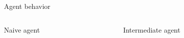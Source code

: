 \documentclass[bigger]{beamer}
\begin{document}
\begin{frame}[label={sec:orga689496}]{Agent behavior}
\begin{columns}
\begin{column}[t]{0.33\columnwidth}
\begin{center}
\small
Naive agent\\[1em]
\end{center}
\end{column}
\begin{column}[t]{0.33\columnwidth}
\begin{center}
\small
Intermediate agent\\[1em]

\end{center}
\end{column}
\end{columns}
\end{frame}
\end{document}
